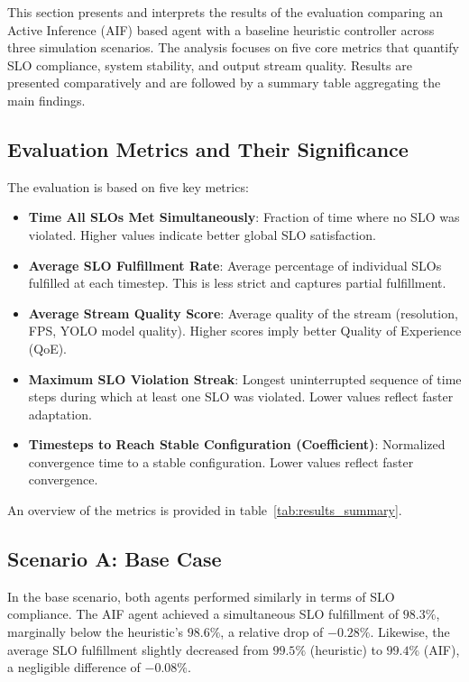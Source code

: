 This section presents and interprets the results of the evaluation comparing an Active Inference (AIF) based agent with a baseline heuristic controller across three simulation scenarios. The analysis focuses on five core metrics that quantify SLO compliance, system stability, and output stream quality. Results are presented comparatively and are followed by a summary table aggregating the main findings.

\subsection{Evaluation Metrics and Their Significance}

The evaluation is based on five key metrics:

\begin{itemize}
  \item \textbf{Time All SLOs Met Simultaneously}: Fraction of time where no SLO was violated. Higher values indicate better global SLO satisfaction.
  \item \textbf{Average SLO Fulfillment Rate}: Average percentage of individual SLOs fulfilled at each timestep. This is less strict and captures partial fulfillment.
  \item \textbf{Average Stream Quality Score}: Average quality of the stream (resolution, FPS, YOLO model quality). Higher scores imply better Quality of Experience (QoE).
  \item \textbf{Maximum SLO Violation Streak}: Longest uninterrupted sequence of time steps during which at least one SLO was violated. Lower values reflect faster adaptation.
  \item \textbf{Timesteps to Reach Stable Configuration (Coefficient)}: Normalized convergence time to a stable configuration. Lower values reflect faster convergence.
\end{itemize}

An overview of the metrics is provided in table~\ref{tab:results_summary}.




\subsection{Scenario A: Base Case}

In the base scenario, both agents performed similarly in terms of SLO compliance. The AIF agent achieved a simultaneous SLO fulfillment of \(98.3\%\), marginally below the heuristic's \(98.6\%\), a relative drop of \(-0.28\%\). Likewise, the average SLO fulfillment slightly decreased from \(99.5\%\) (heuristic) to \(99.4\%\) (AIF), a negligible difference of \(-0.08\%\).

